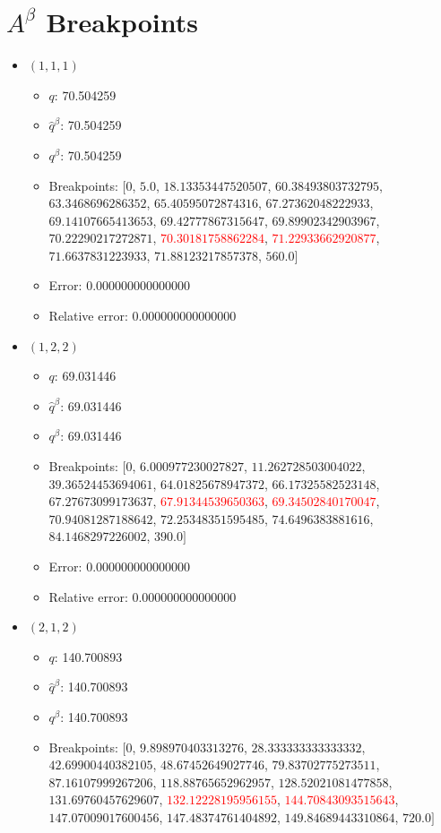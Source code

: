 \documentclass{article}%
\begin{document}
\section{$A^\beta$ Breakpoints}%
\thispagestyle{plain}%
\begin{itemize}%
	\item $(1, 1, 1)$%
	\begin{itemize}%
		\item $q$: 70.504259%
		\item $\hat{q}^\beta$: 70.504259%
		\item $q^\beta$: 70.504259%
		\item Breakpoints: $[$$0$, $5.0$, $18.13353447520507$, $60.38493803732795$, $63.3468696286352$, $65.40595072874316$, $67.27362048222933$, $69.14107665413653$, $69.42777867315647$, $69.89902342903967$, $70.22290217272871$, \textcolor{red}{$70.30181758862284$}, \textcolor{red}{$71.22933662920877$}, $71.6637831223933$, $71.88123217857378$, $560.0$$]$%
		\item Error: 0.000000000000000%
		\item Relative error: 0.000000000000000%
	\end{itemize}%
	\item $(1, 2, 2)$%
	\begin{itemize}%
		\item $q$: 69.031446%
		\item $\hat{q}^\beta$: 69.031446%
		\item $q^\beta$: 69.031446%
		\item Breakpoints: $[$$0$, $6.000977230027827$, $11.262728503004022$, $39.36524453694061$, $64.01825678947372$, $66.17325582523148$, $67.27673099173637$, \textcolor{red}{$67.91344539650363$}, \textcolor{red}{$69.34502840170047$}, $70.94081287188642$, $72.25348351595485$, $74.6496383881616$, $84.1468297226002$, $390.0$$]$%
		\item Error: 0.000000000000000%
		\item Relative error: 0.000000000000000%
	\end{itemize}%
	\item $(2, 1, 2)$%
	\begin{itemize}%
		\item $q$: 140.700893%
		\item $\hat{q}^\beta$: 140.700893%
		\item $q^\beta$: 140.700893%
		\item Breakpoints: $[$$0$, $9.898970403313276$, $28.333333333333332$, $42.69900440382105$, $48.67452649027746$, $79.83702775273511$, $87.16107999267206$, $118.88765652962957$, $128.52021081477858$, $131.69760457629607$, \textcolor{red}{$132.12228195956155$}, \textcolor{red}{$144.70843093515643$}, $147.07009017600456$, $147.48374761404892$, $149.84689443310864$, $720.0$$]$%

\end{itemize}
\end{itemize}
\end{document}
